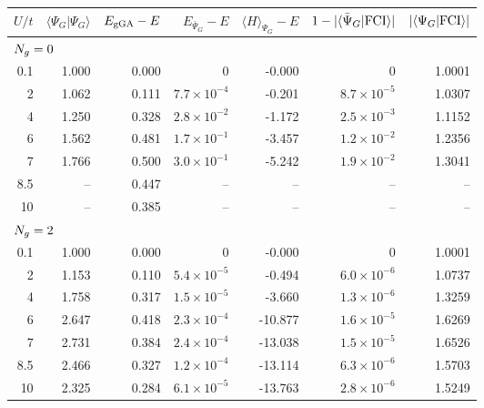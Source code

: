 \begin{tabular}{r rrrrrr}
\toprule
$U/t$ & $\langle\Psi_G|\Psi_G\rangle$ & $E_{\rm gGA}-E$ & $E_{\bar\Psi_G}-E$ & $\langle H\rangle_{\Psi_G}-E$ & $1-|\langle\bar\Psi_G|{\rm FCI}\rangle|$ & $|\langle\Psi_G|{\rm FCI}\rangle|$\\
\midrule
\multicolumn{7}{l}{$N_{g}=0$}\\
0.1 & 1.000 & 0.000 & 0 & -0.000 & 0 & 1.0001\\
2 & 1.062 & 0.111 & $7.7\!\times\!10^{-4}$ & -0.201 & $8.7\!\times\!10^{-5}$ & 1.0307\\
4 & 1.250 & 0.328 & $2.8\!\times\!10^{-2}$ & -1.172 & $2.5\!\times\!10^{-3}$ & 1.1152\\
6 & 1.562 & 0.481 & $1.7\!\times\!10^{-1}$ & -3.457 & $1.2\!\times\!10^{-2}$ & 1.2356\\
7 & 1.766 & 0.500 & $3.0\!\times\!10^{-1}$ & -5.242 & $1.9\!\times\!10^{-2}$ & 1.3041\\
8.5 & -- & 0.447 & -- & -- & -- & --\\
10 & -- & 0.385 & -- & -- & -- & --\\
\midrule
\multicolumn{7}{l}{$N_{g}=2$}\\
0.1 & 1.000 & 0.000 & 0 & -0.000 & 0 & 1.0001\\
2 & 1.153 & 0.110 & $5.4\!\times\!10^{-5}$ & -0.494 & $6.0\!\times\!10^{-6}$ & 1.0737\\
4 & 1.758 & 0.317 & $1.5\!\times\!10^{-5}$ & -3.660 & $1.3\!\times\!10^{-6}$ & 1.3259\\
6 & 2.647 & 0.418 & $2.3\!\times\!10^{-4}$ & -10.877 & $1.6\!\times\!10^{-5}$ & 1.6269\\
7 & 2.731 & 0.384 & $2.4\!\times\!10^{-4}$ & -13.038 & $1.5\!\times\!10^{-5}$ & 1.6526\\
8.5 & 2.466 & 0.327 & $1.2\!\times\!10^{-4}$ & -13.114 & $6.3\!\times\!10^{-6}$ & 1.5703\\
10 & 2.325 & 0.284 & $6.1\!\times\!10^{-5}$ & -13.763 & $2.8\!\times\!10^{-6}$ & 1.5249\\
\bottomrule
\end{tabular}
